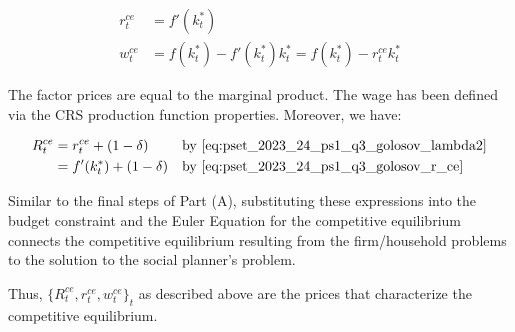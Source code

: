 \begin{align}
    r_t^{ce} &= f'(k_t^*) \label{eq:pset_2023_24_ps1_q3_golosov_r_ce} \\
    w_t^{ce} &= f(k_t^*) - f'(k_t^*)k_t^* = f(k_t^*) - r_t^{ce}k_t^*
\end{align}

The factor prices are equal to the marginal product. The 
wage has been defined via the CRS production function properties.
Moreover, we have:

\begin{align}
    R_t^{ce} &= r_t^{ce} + (1 - \delta) && \text{by \eqref{eq:pset_2023_24_ps1_q3_golosov_lambda2}} \\
    &= f'(k^*_{t}) + (1 - \delta)  && \text{by \eqref{eq:pset_2023_24_ps1_q3_golosov_r_ce}} \\
\end{align}

Similar to the final steps of Part (A), substituting these expressions
into the budget constraint and the Euler Equation for the competitive 
equilibrium connects the competitive equilibrium resulting from the 
firm/household problems to the solution to the social planner's problem.

Thus, $\{R_t^{ce}, r_t^{ce}, w_t^{ce}\}_t$ as described above are the prices that
characterize the competitive equilibrium.